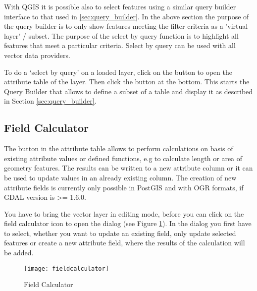 \label{sec:select_by_query}

With QGIS it is possible also to select features using a similar query builder 
interface to that used in \ref{sec:query_builder}. In the above section 
the purpose of the query builder is to only show features meeting the 
filter criteria as a 'virtual layer' / subset. The purpose of the select by 
query function is to highlight all features that meet a particular criteria. 
Select by query can be used with all vector data providers.

To do a `select by query' on a loaded layer, click on the 
button  to open the attribute table of the layer. Then 
click the  button at the bottom. This starts the Query Builder 
that allows to define a subset of a table and display it as described in Section 
\ref{sec:query_builder}.

\subsection{Field Calculator}\label{sec:field_calculator}

The  button in the 
attribute table allows to perform calculations on basis of existing 
attribute values or defined functions, e.g to calculate length or area 
of geometry features. The results can be written to a new attribute column 
or it can be used to update values in an already existing column. The creation 
of new attribute fields is currently only possible in PostGIS and with OGR 
formats, if GDAL version is >= 1.6.0. 

You have to bring the vector layer in editing mode, before you can click on 
the field calculator icon to open the dialog (see Figure 
\ref{fig:field_calculator}). In the dialog you first have to select, whether 
you want to update an existing field, only update selected features or 
create a new attribute field, where the results of the calculation will be added. 

\begin{figure}[ht]
  \begin{center}
    \caption{Field Calculator \nixcaption}\label{fig:field_calculator}\smallskip
    \texttt{[image: fieldcalculator]}
  \end{center}
\end{figure}

